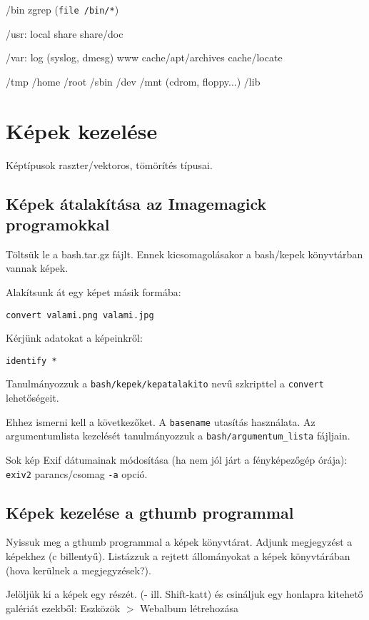 \documentclass[a4paper]{article}
\newcommand{\code}{\texttt}
\newcommand{\dir}{\code}
\newcommand{\Ctrl}{\framebox{\texttt{Ctrl}}}
\begin{document}
/bin zgrep (\code{file /bin/*})

/usr: local share share/doc

/var: log (syslog, dmesg) www cache/apt/archives cache/locate

/tmp /home /root /sbin /dev /mnt (cdrom, floppy...) /lib

\section{Képek kezelése}
Képtípusok raszter/vektoros, tömörítés típusai.

\subsection{Képek átalakítása az Imagemagick programokkal}

Töltsük le a bash.tar.gz fájlt. Ennek kicsomagolásakor a bash/kepek
könyvtárban vannak képek.

Alakítsunk át egy képet másik formába:
\begin{Verbatim}
convert valami.png valami.jpg
\end{Verbatim}

Kérjünk adatokat a képeinkről:
\begin{Verbatim}
identify *
\end{Verbatim}

Tanulmányozzuk a \code{bash/kepek/kepatalakito} nevű szkripttel a
\code{convert} lehetőségeit.

Ehhez ismerni kell a következőket.
A \code{basename} utasítás használata.
Az argumentumlista kezelését tanulmányozzuk a \dir{bash/argumentum\_lista} fájljain.

Sok kép Exif dátumainak módosítása (ha nem jól járt a fényképezőgép
órája): \code{exiv2} parancs/csomag \code{-a} opció.

\subsection{Képek kezelése a gthumb programmal}
Nyissuk meg a gthumb programmal a képek könyvtárat. Adjunk megjegyzést a
képekhez (c billentyű). Listázzuk a rejtett állományokat a képek
könyvtárában (hova kerülnek a megjegyzések?).

Jelöljük ki a képek egy részét. (\Ctrl- ill. Shift-katt) és csináljuk egy
honlapra kitehető galériát ezekből: Eszközök $>$ Webalbum létrehozása

\newpage
\appendix
\end{document}
